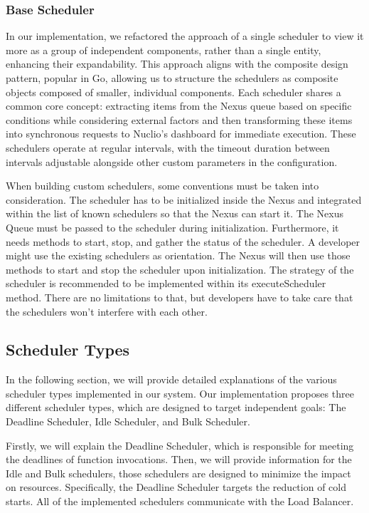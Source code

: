 \subsubsection{Base Scheduler}
\label{sec:base-scheduler}

In our implementation, we refactored the approach of a single scheduler to view it more as a group of independent components, rather than a single entity, enhancing their expandability. This approach aligns with the composite design pattern, popular in Go, allowing us to structure the schedulers as composite objects composed of smaller, individual components. Each scheduler shares a common core concept: extracting items from the Nexus queue based on specific conditions while considering external factors and then transforming these items into synchronous requests to Nuclio's dashboard for immediate execution. These schedulers operate at regular intervals, with the timeout duration between intervals adjustable alongside other custom parameters in the configuration.

When building custom schedulers, some conventions must be taken into consideration. The scheduler has to be initialized inside the Nexus and integrated within the list of known schedulers so that the Nexus can start it. The Nexus Queue must be passed to the scheduler during initialization. Furthermore, it needs methods to start, stop, and gather the status of the scheduler. A developer might use the existing schedulers as orientation. The Nexus will then use those methods to start and stop the scheduler upon initialization. The strategy of the scheduler is recommended to be implemented within its executeScheduler method. There are no limitations to that, but developers have to take care that the schedulers won't interfere with each other.


\subsection{Scheduler Types}
\label{sec:scheduler-types}
In the following section, we will provide detailed explanations of the various scheduler types implemented in our system. Our implementation proposes three different scheduler types, which are designed to target independent goals: The Deadline Scheduler, Idle Scheduler, and Bulk Scheduler.

Firstly, we will explain the Deadline Scheduler, which is responsible for meeting the deadlines of function invocations. Then, we will provide information for the Idle and Bulk schedulers, those schedulers are designed to minimize the impact on resources. Specifically, the Deadline Scheduler targets the reduction of cold starts. All of the implemented schedulers communicate with the Load Balancer.

